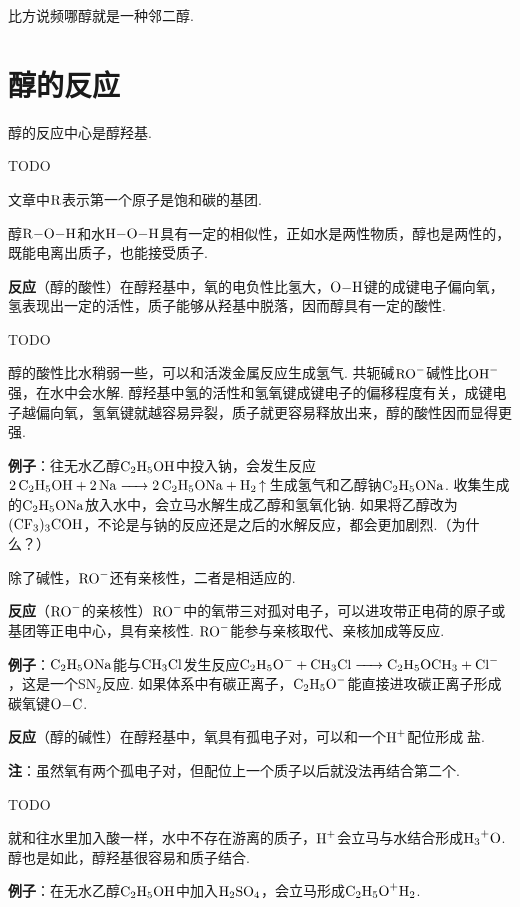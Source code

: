 \documentclass{article}
\begin{document}

比方说频哪醇就是一种邻二醇.

\section*{醇的反应}

醇的反应中心是醇羟基.

TODO

\small *文章中$\ce{R}$表示第一个原子是饱和碳的基团.

醇$\ce{R-O-H}$和水$\ce{H-O-H}$具有一定的相似性，正如水是两性物质，醇也是两性的，既能电离出质子，也能接受质子.

\textbf{反应}（醇的酸性）在醇羟基中，氧的电负性比氢大，$\ce{O-H}$键的成键电子偏向氧，氢表现出一定的活性，质子能够从羟基中脱落，因而醇具有一定的酸性.

TODO

醇的酸性比水稍弱一些，可以和活泼金属反应生成氢气. 共轭碱$\ce{RO-}$碱性比$\ce{OH-}$强，在水中会水解. 醇羟基中氢的活性和氢氧键成键电子的偏移程度有关，成键电子越偏向氧，氢氧键就越容易异裂，质子就更容易释放出来，醇的酸性因而显得更强.

\textbf{例子}：往无水乙醇$\ce{C2H5OH}$中投入钠，会发生反应$\ce{2C2H5OH + 2Na -> 2C2H5ONa + H2 ^}$生成氢气和乙醇钠$\ce{C2H5ONa}$. 收集生成的$\ce{C2H5ONa}$放入水中，会立马水解生成乙醇和氢氧化钠. 如果将乙醇改为$\ce{(CF3)3COH}$，不论是与钠的反应还是之后的水解反应，都会更加剧烈.（为什么？）

除了碱性，$\ce{RO-}$还有亲核性，二者是相适应的.

\textbf{反应}（$\ce{RO-}$的亲核性）$\ce{RO-}$中的氧带三对孤对电子，可以进攻带正电荷的原子或基团等正电中心，具有亲核性. $\ce{RO-}$能参与亲核取代、亲核加成等反应.

\textbf{例子}：$\ce{C2H5ONa}$能与$\ce{CH3Cl}$发生反应$\ce{C2H5O- + CH3Cl -> C2H5OCH3 + Cl-}$，这是一个SN$_2$反应. 如果体系中有碳正离子，$\ce{C2H5O-}$能直接进攻碳正离子形成碳氧键$\ce{O-C}$.

\textbf{反应}（醇的碱性）在醇羟基中，氧具有孤电子对，可以和一个$\ce{H+}$配位形成𨦡盐.

\textbf{注}：虽然氧有两个孤电子对，但配位上一个质子以后就没法再结合第二个.

TODO

就和往水里加入酸一样，水中不存在游离的质子，$\ce{H+}$会立马与水结合形成$\ce{H3+O}$. 醇也是如此，醇羟基很容易和质子结合.

\textbf{例子}：在无水乙醇$\ce{C2H5OH}$中加入$\ce{H2SO4}$，会立马形成$\ce{C2H5O+H2}$.
\end{document}
